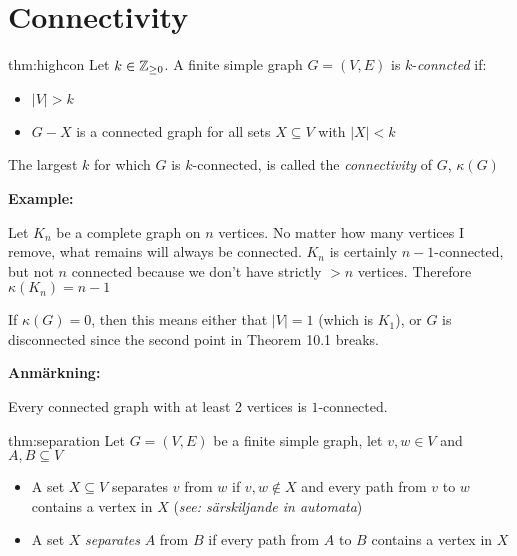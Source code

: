 \section{Connectivity}\par
\begin{theo}{thm:highcon}
  Let $k\in\mathbb{Z}_{\geq0}$. A finite simple graph $G = (V,E)$ is $k$-\textit{conncted} if:\par
  \begin{itemize}
    \item $\left|V\right|>k$\par
    \item $G-X$ is a connected graph for all sets $X\subseteq V$ with $\left|X\right|<k$
  \end{itemize}
  \par\bigskip
  \noindent The largest $k$ for which $G$ is $k$-connected, is called the \textit{connectivity} of $G$, $\kappa(G)$
\end{theo}
\par\bigskip
\noindent\textbf{Example:}\par
\noindent Let $K_n$ be a complete graph on $n$ vertices. No matter how many vertices I remove, what remains will always be connected. $K_n$ is certainly $n-1$-connected, but not $n$ connected because we don't have strictly $>n$ vertices. Therefore $\kappa(K_n) = n-1$
\par\bigskip
\noindent If $\kappa(G) = 0$, then this means either that $\left|V\right| = 1$ (which is $K_1$), or $G$ is disconnected since the second point in Theorem 10.1 breaks.
\par\bigskip
\noindent\textbf{Anmärkning:}\par
\noindent Every connected graph with at least 2 vertices is $1$-connected.
\par\bigskip
\begin{theo}[Separation]{thm:separation}
  Let $G = (V,E)$ be a finite simple graph, let $v,w\in V$ and $A,B\subseteq V$\par
  \begin{itemize}
    \item A set $X\subseteq V$ separates $v$ from $w$ if $v,w\not\in X$ and every path from $v$ to $w$ contains a vertex in $X$ (\textit{see: särskiljande in automata})\par
    \item A set $X$ \textit{separates} $A$ from $B$ if every path from $A$ to $B$ contains a vertex in $X$
  \end{itemize}
\end{theo}
